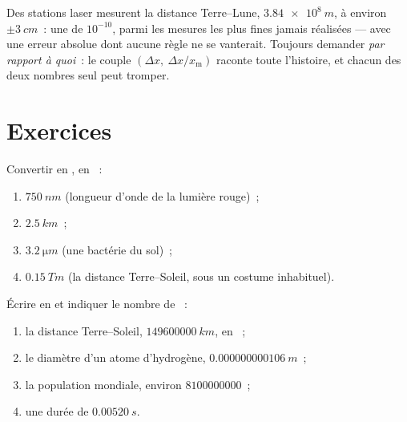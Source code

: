 \begin{remark}\label{rem:g10:orders-of-magnitude:precision}
Des stations laser mesurent la distance Terre--Lune,
$\qty{3.84e8}{m}$, à environ $\pm\qty{3}{cm}$~: une  de $10^{-10}$, parmi les mesures les plus fines jamais
réalisées --- avec une erreur absolue dont aucune règle ne se
vanterait. Toujours demander \emph{par rapport à quoi}~: le couple
$(\Delta x,\ \Delta x / x_{\text{m}})$ raconte toute l'histoire, et
chacun des deux nombres seul peut tromper.
\end{remark}

\section{Exercices}

\begin{exercise}[$\star$]\label{exo:g10:orders-of-magnitude:1}
Convertir en , en ~:
\begin{enumerate}
  \item $\qty{750}{nm}$ (longueur d'onde de la lumière rouge)~;
  \item $\qty{2.5}{km}$~;
  \item $\qty{3.2}{\micro m}$ (une bactérie du sol)~;
  \item $\qty{0.15}{Tm}$ (la distance Terre--Soleil, sous un costume
        inhabituel).
\end{enumerate}
\end{exercise}

\begin{exercise}[$\star$]\label{exo:g10:orders-of-magnitude:2}
Écrire en  et indiquer le nombre de ~:
\begin{enumerate}
  \item la distance Terre--Soleil, $\qty{149600000}{km}$, en ~;
  \item le diamètre d'un atome d'hydrogène, $\qty{0.000000000106}{m}$~;
  \item la population mondiale, environ $\num{8100000000}$~;
  \item une durée de $\qty{0.00520}{s}$.
\end{enumerate}
\end{exercise}

